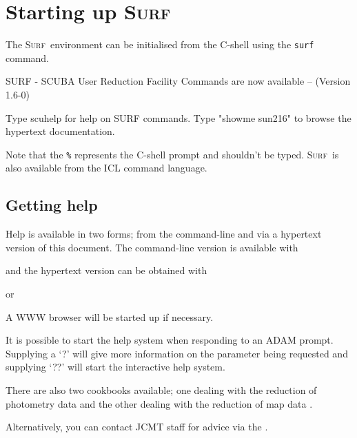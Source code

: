 \documentclass[twoside,11pt]{starlink}
\providecommand{\scusoft}          {\textsc{Surf}}
\begin{document}
\section{Starting up \scusoft \label{startup}}

The \scusoft\ environment can be initialised from the C-shell using the
\texttt{surf} command.

\begin{terminalv}

   SURF - SCUBA User Reduction Facility
     Commands are now available -- (Version 1.6-0)

     Type scuhelp for help on SURF commands.
     Type "showme sun216" to browse the hypertext documentation.

\end{terminalv}

Note that the \texttt{\%} represents the C-shell prompt and shouldn't be typed.
\scusoft\ is also available from the ICL command language.


\subsection{Getting help}

Help is available in two forms; from the command-line and via a hypertext
version of this document. The command-line version is available with

\begin{terminalv}
\end{terminalv}

and the hypertext version can be obtained with

\begin{terminalv}
\end{terminalv}
or
\begin{terminalv}
\end{terminalv}
A WWW browser will be started up if necessary.

It is possible to start the help system when responding to
an ADAM prompt. Supplying a `?' will give more information on the
parameter being requested and supplying `??' will start the interactive
help system.

There are also two cookbooks available; one dealing with the reduction of
photometry data \cite{S97} and the other dealing with the reduction of
map data \cite{SANDELL97}.

Alternatively, you can contact JCMT staff for advice via the
.
\end{document}

